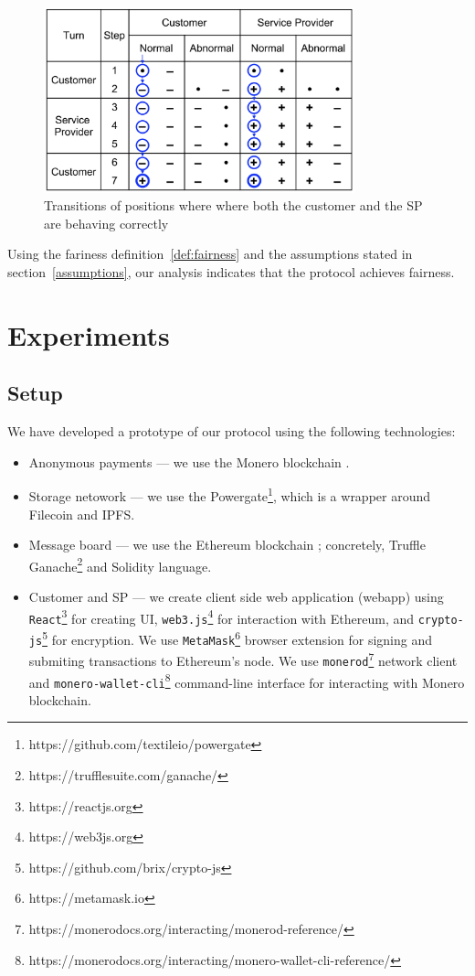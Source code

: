 \documentclass{ieeeaccess}
\begin{document}
\begin{figure}[h!]
\includegraphics[width=9cm]{formal-rational-path.png}
\centering
\caption{Transitions of positions where where both the customer and the SP are behaving correctly}
\label{fig:rational}
\end{figure}

Using the fariness definition~\ref{def:fairness} and the assumptions stated in section~\ref{assumptions}, our analysis indicates that the protocol achieves fairness.

\section{Experiments}\label{sec:experiments}

\subsection*{Setup}

We have developed a prototype of our protocol using the following technologies:

\begin{itemize}
  \item{Anonymous payments} — we use the Monero blockchain \cite{noetherRingSignatureConfidential2015}.
  \item{Storage netowork} — we use the Powergate\footnote{https://github.com/textileio/powergate}, which is a wrapper around Filecoin and IPFS.
  \item{Message board} — we use the Ethereum blockchain \cite{woodEthereumSecureDecentralised2014}; concretely, Truffle Ganache\footnote{https://trufflesuite.com/ganache/} and Solidity language.
  \item{Customer and SP} — we create client side web application (webapp) using \texttt{React}\footnote{https://reactjs.org} for creating UI, \texttt{web3.js}\footnote{https://web3js.org} for interaction with Ethereum, and \texttt{crypto-js}\footnote{https://github.com/brix/crypto-js} for encryption. We use \texttt{MetaMask}\footnote{https://metamask.io} browser extension for signing and submiting transactions to Ethereum's node. We use \texttt{monerod}\footnote{https://monerodocs.org/interacting/monerod-reference/} network client and \texttt{monero-wallet-cli}\footnote{https://monerodocs.org/interacting/monero-wallet-cli-reference/} command-line interface for interacting with Monero blockchain.
\end{itemize}
\end{document}
